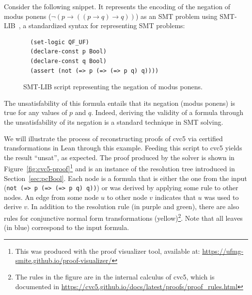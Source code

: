 Consider the following snippet. It represents the encoding of the negation of modus ponens
($\neg (p \rightarrow ((p \rightarrow q) \rightarrow q))$) as an SMT problem using SMT-LIB~\cite{smtlib},
a standardized syntax for representing SMT problems:

\begin{figure}[h]
\begin{verbatim}
  (set-logic QF_UF)
  (declare-const p Bool)
  (declare-const q Bool)
  (assert (not (=> p (=> (=> p q) q))))
\end{verbatim}
\caption{SMT-LIB script representing the negation of modus ponens.}\label{negModusPonens}
\end{figure}

The unsatisfability of this formula entails that its negation (modus ponens) is true for any values of $p$ and $q$.
%
Indeed, deriving the validity of a formula through the unsatisfability of its negation is a standard technique in
SMT solving.

We will illustrate the process of reconstructing proofs of cvc5 via certified transformations
in Lean through this example. Feeding this script to cvc5 yields the result ``unsat'', as expected.
The proof produced by the solver is shown in Figure~\ref{fig:cvc5-proof}\footnote{This was produced with the proof visualizer tool, available at: \url{https://ufmg-smite.github.io/proof-visualizer/}} and is an instance of the resolution tree introduced in Section~\ref{sec:pcBool}.
Each node is a formula that is either the one from the input (\texttt{not (=> p (=> (=> p q) q))}) or was derived by applying some
rule to other nodes. An edge from some node $u$ to other node $v$ indicates that
$u$ was used to derive $v$.
In addition to the resolution rule (in purple and green), there are also rules for conjunctive normal form transformations (yellow)\footnote{The rules in the figure are in the internal calculus of cvc5, which is documented in \url{https://cvc5.github.io/docs/latest/proofs/proof_rules.html}}. Note that all leaves (in blue) correspond to the input formula.

\makeatletter
\setlength{\@fptop}{0pt}
\makeatother

